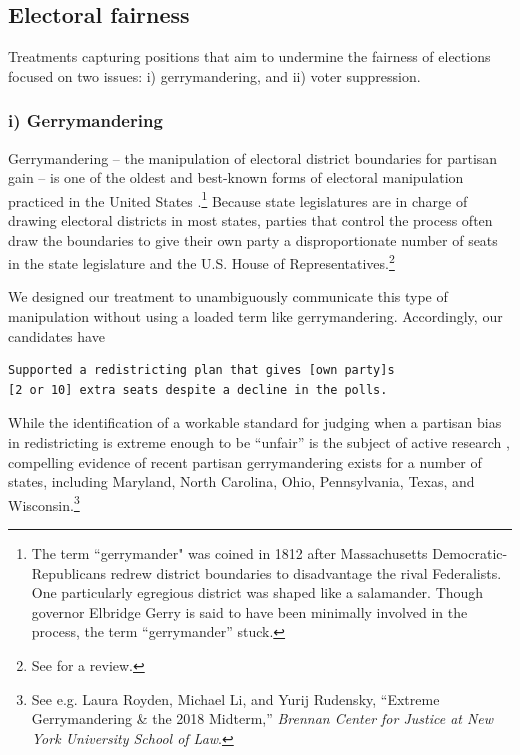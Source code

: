 \documentclass[12pt]{article}
\begin{document}
\subsection{Electoral fairness}

Treatments capturing positions that aim to undermine the fairness of elections focused on two issues: i) gerrymandering, and ii) voter suppression.

\subsubsection*{i) Gerrymandering}

Gerrymandering -- the manipulation of electoral district boundaries for partisan gain -- is one of the oldest and best-known forms of electoral manipulation practiced in the United States \citep{McGannSmithLatnerEtAl2016,Seabrook2017}.\footnote{The term ``gerrymander" was coined in 1812 after Massachusetts Democratic-Republicans redrew district boundaries to disadvantage the rival Federalists. One particularly egregious district was shaped like a salamander. Though governor Elbridge Gerry is said to have been minimally involved in the process, the term ``gerrymander'' stuck.} Because state legislatures are in charge of drawing electoral districts in most states, parties that control the process often draw the boundaries to give their own party a disproportionate number of seats in the state legislature and the U.S. House of Representatives.\footnote{See \citet{MaglebyMcDonaldKrasnoEtAl2018} for a review.}

We designed our treatment to unambiguously communicate this type of manipulation without using a loaded term like gerrymandering. Accordingly, our candidates have

\begin{center}
\begin{varwidth}{\linewidth}
\begin{verbatim}
Supported a redistricting plan that gives [own party]s
[2 or 10] extra seats despite a decline in the polls.
\end{verbatim}
\end{varwidth}
\end{center}

While the identification of a workable standard for judging when a partisan bias in redistricting is extreme enough to be ``unfair'' is the subject of active research \citep{Chen2013,ChoLiu2016}, compelling evidence of recent partisan gerrymandering exists for a number of states, including Maryland, North Carolina, Ohio, Pennsylvania, Texas, and Wisconsin.\footnote{See e.g. Laura Royden, Michael Li, and Yurij Rudensky, ``Extreme Gerrymandering \& the 2018 Midterm,'' \emph{Brennan Center for Justice at New York University School of Law}.}
\end{document}
